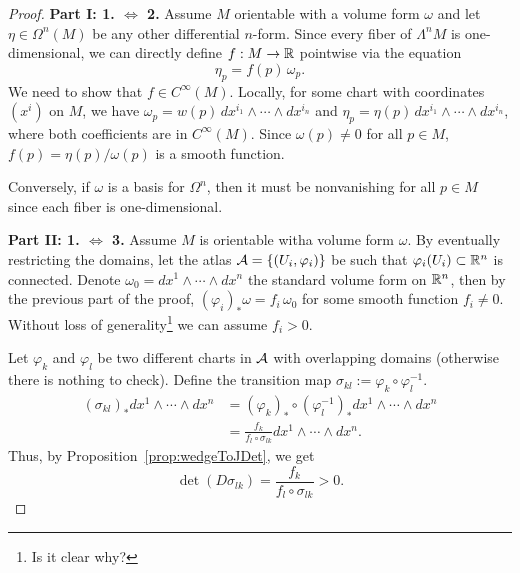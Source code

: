 \begin{proof}
  \textbf{Part I: 1. $\Leftrightarrow$ 2.}
  Assume $M$ orientable with a volume form $\omega$ and let $\eta\in\Omega^n(M)$ be any other differential $n$-form.
  Since every fiber of $\Lambda^n M$ is one-dimensional, we can directly define $f:M \to \mathbb{R}$ pointwise via the equation
  \[
    \eta_p = f(p)\,\omega_p.
  \]
  We need to show that $f\in C^\infty(M)$.
  Locally, for some chart with coordinates $(x^i)$ on $M$, we have $\omega_p = w(p)\, dx^{i_1}\wedge\cdots\wedge dx^{i_n}$ and $\eta_p = \eta(p)\, dx^{i_1}\wedge\cdots\wedge dx^{i_n}$, where both coefficients are in  $C^\infty(M)$.
  Since $\omega(p) \neq 0$ for all $p\in M$, $f(p) = \eta(p)/\omega(p)$ is a smooth function.

  Conversely, if $\omega$ is a basis for $\Omega^n$, then it must be nonvanishing for all $p\in M$ since each fiber is one-dimensional.
  \medskip

  \textbf{Part II: 1. $\Leftrightarrow$ 3.}
  Assume $M$ is orientable witha volume form $\omega$.
  By eventually restricting the domains, let the atlas $\mathcal{A} = \{(U_i, \varphi_i)\}$ be such that $\varphi_i(U_i) \subset \mathbb{R}^n$ is connected.
  Denote $\omega_0 = dx^1 \wedge\cdots\wedge dx^n$ the standard volume form on $\mathbb{R}^n$, then by the previous part of the proof, $(\varphi_i)_*\omega = f_i\,\omega_0$ for some smooth function $f_i \neq 0$.
  Without loss of generality\footnote{Is it clear why?} we can assume $f_i > 0$.

  Let $\varphi_k$ and $\varphi_l$ be two different charts in $\mathcal{A}$ with overlapping domains (otherwise there is nothing to check).
   Define the transition map $\sigma_{kl} := \varphi_k\circ\varphi_l^{-1}$.
  \begin{align}
    (\sigma_{kl})_* dx^1\wedge\cdots\wedge dx^n &= (\varphi_k)_* \circ (\varphi_l^{-1})_* dx^1\wedge \cdots\wedge dx^n \\
                                         &= \frac{f_k}{f_l \circ \sigma_{lk}} dx^1\wedge \cdots\wedge dx^n. 
  \end{align}
  Thus, by Proposition~\ref{prop:wedgeToJDet}, we get
  \begin{equation}
    \det(D\sigma_{lk}) = \frac{f_k}{f_l \circ \sigma_{lk}} > 0.
  \end{equation}


\end{proof}
